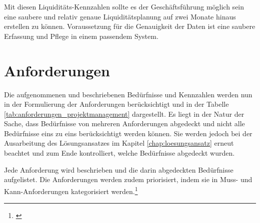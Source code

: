 Mit diesen Liquiditäts-Kennzahlen sollte es der Geschäftsführung möglich sein
eine saubere und relativ genaue Liquiditätsplanung auf zwei Monate hinaus
erstellen zu können. Voraussetzung für die Genauigkeit der Daten ist eine
saubere Erfassung und Pflege in einem passendem System.

\clearpage

\section{Anforderungen}\label{chap:sec_anforderungen}
Die aufgenommenen und beschriebenen Bedürfnisse und Kennzahlen werden nun in der Formulierung
der Anforderungen berücksichtigt und in der Tabelle \ref{tab:anforderungen_projektmanagement} 
dargestellt. Es liegt in der Natur der Sache, dass Bedürfnisse von mehreren 
Anforderungen abgedeckt und nicht alle Bedürfnisse eins zu eins berücksichtigt 
werden können. Sie werden jedoch bei der Ausarbeitung des Lösungsansatzes im Kapitel \ref{chap:loesungsansatz}
erneut beachtet und zum Ende kontrolliert, welche Bedürfnisse abgedeckt wurden.

Jede Anforderung wird beschrieben und die darin abgedeckten Bedürfnisse aufgelistet. 
Die Anforderungen werden zudem priorisiert, indem sie in Muss- und Kann-Anforderungen 
kategorisiert werden.\footnote{\citealp*[Vgl.][S. 32]{hobel2006gabler}}

